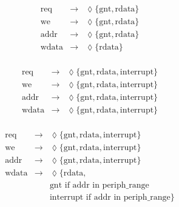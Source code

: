 \begin{equation}
\label{dict:contract_cache_nointerrupt}
\begin{array}{rcl}
\text{req} & \rightarrow & \lozenge \{ \text{gnt}, \text{rdata}\} \\
\text{we} & \rightarrow & \lozenge \{ \text{gnt}, \text{rdata}\} \\
\text{addr} & \rightarrow & \lozenge \{ \text{gnt}, \text{rdata}\} \\
\text{wdata} & \rightarrow & \lozenge \{ \text{rdata} \} \\
\end{array}
\end{equation}

\begin{equation}
\label{dict:contract_cache_interrupt}
\begin{array}{rcl}
\text{req} & \rightarrow & \lozenge \{ \text{gnt}, \text{rdata}, \text{interrupt}\} \\
\text{we} & \rightarrow & \lozenge \{ \text{gnt}, \text{rdata}, \text{interrupt}\} \\
\text{addr} & \rightarrow & \lozenge \{ \text{gnt}, \text{rdata}, \text{interrupt}\} \\
\text{wdata} & \rightarrow & \lozenge \{ \text{gnt}, \text{rdata}, \text{interrupt} \} \\
\end{array}
\end{equation}

\begin{equation}
\label{dict:contract_cache_interrupt_addressdependent}
\begin{array}{rcl}
\text{req}  & \rightarrow & \lozenge \{ \text{gnt}, \text{rdata}, \text{interrupt}\} \\
\text{we}  & \rightarrow & \lozenge \{ \text{gnt}, \text{rdata}, \text{interrupt}\} \\
\text{addr} & \rightarrow & \lozenge \{ \text{gnt}, \text{rdata}, \text{interrupt}\} \\
\text{wdata} & \rightarrow & \lozenge \{ \text{rdata}, \\
& & \text{gnt if addr in periph\_range} \\
& & \text{interrupt if addr in periph\_range} \} \\

\end{array}
\end{equation}

